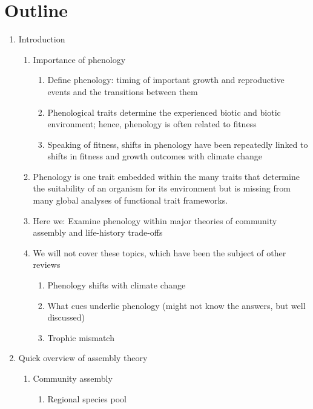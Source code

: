 \documentclass[11pt]{article}
\begin{document}
\section{Outline}
\begin{enumerate}
\item Introduction %
\begin{enumerate}
\item Importance of phenology  
\begin{enumerate}
\item Define phenology: timing of important growth and reproductive events and the transitions between them
\item Phenological traits determine the experienced biotic and biotic environment; hence, phenology is often related to fitness
\item Speaking of fitness, shifts in phenology have been repeatedly linked to shifts in fitness and growth outcomes with climate change \citep{Cleland:2012}
\end{enumerate}
\item Phenology is one trait embedded within the many traits that determine the suitability of an organism for its environment but is missing from many global analyses of functional trait frameworks.
\item Here we: Examine phenology within major theories of community assembly and life-history trade-offs
\item We will not cover these topics, which have been the subject of other reviews %
\begin{enumerate}
\item Phenology shifts with climate change \citep{menzel2020}
\item What cues underlie phenology (might not know the answers, but well discussed) \citep{chuinearees}
\item Trophic mismatch \citep{kharouba2018}
\end{enumerate}
\end{enumerate}
\item Quick overview of assembly theory %
\begin{enumerate}
\item Community assembly
\begin{enumerate}
\item Regional species pool

\end{enumerate}
\end{enumerate}
\end{enumerate}
\end{document}
